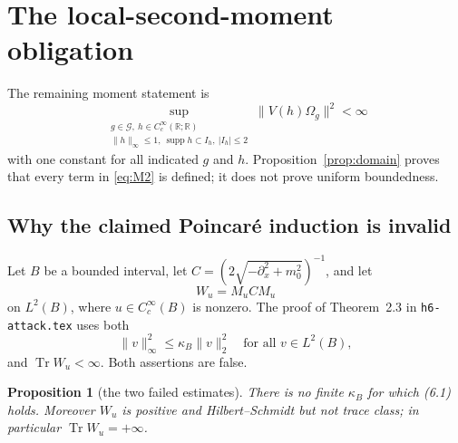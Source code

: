 \documentclass[11pt,a4paper]{article}
\newtheorem{proposition}[theorem]{Proposition}
\theoremstyle{remark}
\newcommand{\R}{\mathbb R}
\newcommand{\Om}{\Omega}
\newcommand{\G}{\mathcal G}
\DeclareMathOperator{\supp}{supp}
\DeclareMathOperator{\Tr}{Tr}
\begin{document}
\section{The local-second-moment obligation}\label{sec:moment}

The remaining moment statement is
\begin{equation}\label{eq:M2}
 \tag{M$_2$}
 \sup_{\substack{g\in\G,\ h\in C_c^\infty(\R;\R)\\
                   \|h\|_\infty\le1,
                   \ \supp h\subset I_h,\ |I_h|\le2}}
 \|V(h)\Om_g\|^2<\infty
\end{equation}
with one constant for all indicated $g$ and $h$.
Proposition~\ref{prop:domain} proves that every term in \eqref{eq:M2} is defined; it does not prove
uniform boundedness.

\subsection{Why the claimed Poincar\'e induction is invalid}

Let $B$ be a bounded interval, let
$C=(2\sqrt{-\partial_x^2+m_0^2})^{-1}$, and let
\[
 W_u=M_uCM_u
\]
on $L^2(B)$, where $u\in C_c^\infty(B)$ is nonzero.  The proof of Theorem~2.3 in
\texttt{h6-attack.tex} uses both
\[
 \|v\|_\infty^2\le\kappa_B\|v\|_2^2
 \quad\text{for all }v\in L^2(B),                                      \tag{6.1}
\]
and $\Tr W_u<\infty$.  Both assertions are false.

\begin{proposition}[the two failed estimates]\label{prop:failed}
There is no finite $\kappa_B$ for which \emph{(6.1)} holds.  Moreover $W_u$ is positive and
Hilbert--Schmidt but not trace class; in particular $\Tr W_u=+\infty$.
\end{proposition}
\end{document}
